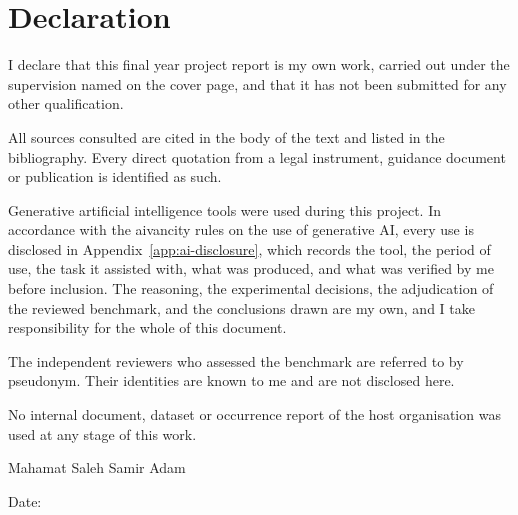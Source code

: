 \chapter*{Declaration}

I declare that this final year project report is my own work, carried out under
the supervision named on the cover page, and that it has not been submitted for
any other qualification.

All sources consulted are cited in the body of the text and listed in the
bibliography. Every direct quotation from a legal instrument, guidance document
or publication is identified as such.

Generative artificial intelligence tools were used during this project. In
accordance with the aivancity rules on the use of generative AI, every use is
disclosed in Appendix~\ref{app:ai-disclosure}, which records the tool, the period
of use, the task it assisted with, what was produced, and what was verified by me
before inclusion. The reasoning, the experimental decisions, the adjudication of
the reviewed benchmark, and the conclusions drawn are my own, and I take
responsibility for the whole of this document.

The independent reviewers who assessed the benchmark are referred to by
pseudonym. Their identities are known to me and are not disclosed here.

No internal document, dataset or occurrence report of the host organisation was
used at any stage of this work.

\vspace{2cm}
\noindent Mahamat Saleh Samir Adam

\vspace{0.4cm}
\noindent Date: \submissiondate
